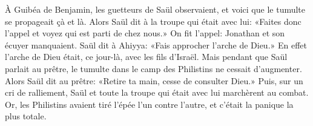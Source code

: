 À Guibéa de Benjamin, les guetteurs de Saül observaient,
	et voici que le tumulte se propageait çà et là.
Alors Saül dit à la troupe qui était avec lui:
	«Faites donc l’appel et voyez qui est parti de chez nous.»
On fit l’appel: Jonathan et son écuyer manquaient.
Saül dit à Ahiyya: «Fais approcher l’arche de Dieu.»
	En effet l’arche de Dieu était, ce jour-là, avec les fils d’Israël.
Mais pendant que Saül parlait au prêtre,
	le tumulte dans le camp des Philistins ne cessait d’augmenter.
Alors Saül dit au prêtre: «Retire ta main, cesse de consulter Dieu.»
Puis, sur un cri de ralliement,
	Saül et toute la troupe qui était avec lui marchèrent au combat.
Or, les Philistins avaient tiré l’épée l’un contre l’autre,
	et c’était la panique la plus totale.
